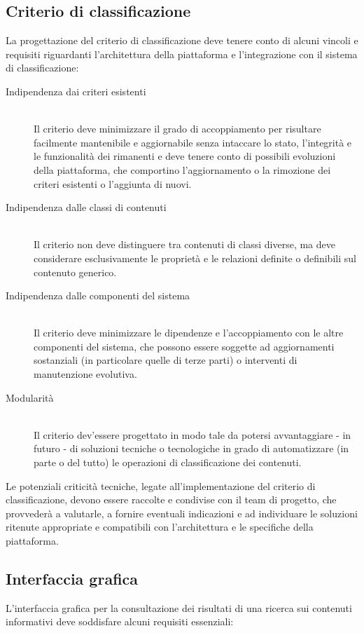 \subsection{Criterio di classificazione}
\label{sec:tesi:progetto:requisiti:criterio-classificazione}
La progettazione del criterio di classificazione deve tenere conto di alcuni vincoli e requisiti riguardanti l'architettura della piattaforma e l'integrazione con il sistema di classificazione:

\begin{description}
	\item[Indipendenza dai criteri esistenti] \hfill \\
	Il criterio deve minimizzare il grado di accoppiamento per risultare facilmente mantenibile e aggiornabile senza intaccare lo stato, l'integrità e le funzionalità dei rimanenti e deve tenere conto di possibili evoluzioni della piattaforma, che comportino l'aggiornamento o la rimozione dei criteri esistenti o l'aggiunta di nuovi.
	\item[Indipendenza dalle classi di contenuti] \hfill \\
	Il criterio non deve distinguere tra contenuti di classi diverse, ma deve considerare esclusivamente le proprietà e le relazioni definite o definibili sul contenuto generico.
	\item[Indipendenza dalle componenti del sistema] \hfill \\
	Il criterio deve minimizzare le dipendenze e l'accoppiamento con le altre componenti del sistema, che possono essere soggette ad aggiornamenti sostanziali (in particolare quelle di terze parti) o interventi di manutenzione evolutiva.
	\item[Modularità] \hfill \\
	Il criterio dev'essere progettato in modo tale da potersi avvantaggiare - in futuro - di soluzioni tecniche o tecnologiche in grado di automatizzare (in parte o del tutto) le operazioni di classificazione dei contenuti.
\end{description}

Le potenziali criticità tecniche, legate all'implementazione del criterio di classificazione, devono essere raccolte e condivise con il team di progetto, che provvederà a valutarle, a fornire eventuali indicazioni e ad individuare le soluzioni ritenute appropriate e compatibili con l'architettura e le specifiche della piattaforma.

\subsection{Interfaccia grafica}
\label{sec:tesi:progetto:requisiti:interfaccia-grafica}
L'interfaccia grafica per la consultazione dei risultati di una ricerca sui contenuti informativi deve soddisfare alcuni requisiti essenziali:

